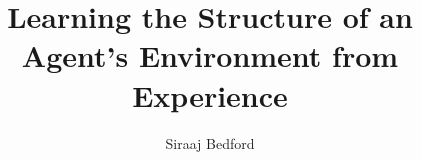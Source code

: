 \documentclass[report,            %
               12pt,oneside,openany,a4paper, %
               a5block,                      %
              afrikaans ,english,           %
               ]{usthesis}
\title{\textbf{\Huge{Learning the Structure of an Agent's Environment from Experience}}}
\author{Siraaj Bedford}
       {Siraaj Bedford\\
           21093741}
\begin{document}
\pagestyle{fancy}
\renewcommand{\chaptermark}[1]{\markboth{#1}{#1}}
\fancyhead[R]{}
\fancyhead[L]{\chaptername\ \thechapter\ --\ \leftmark}
\setlength{\headheight}{15pt}%

\frontmatter%

\TitlePage
{\pagestyle{plain}

\cleardoublepage}




{\pagestyle{plain}
\tableofcontents
\cleardoublepage}

\listoffigures
\listoftables
\listofalgorithms


\mainmatter%








\appendix%


\backmatter%


\renewcommand{\thesection}{A.\arabic{section}}
\renewcommand{\thechapter}{A.}
\begin{appendix}



%
\end{appendix}
\end{document}
